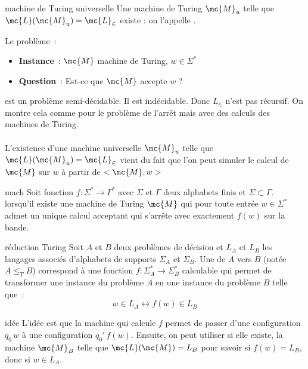 \begin{definition}{}{machine de Turing universelle}
    Une machine de Turing $\mc{M}_u$ telle que $\mc{L}(\mc{M}_u) = \mc{L}_\in$ existe : on l'appelle .
\end{definition}

\begin{remarque}{}{}
    Le problème~:
    \begin{itemize}
        \item \textbf{Instance}~: $\mc{M}$ machine de Turing, $w \in \Sigma^*$ 
        \item \textbf{Question}~: Est-ce que $\mc{M}$ accepte $w$ ?
    \end{itemize}
    est un problème semi-décidable. Il est indécidable. Donc $L_\in$ n'est pas récursif. On montre cela comme pour le problème de l'arrêt mais avec des calculs des machines de Turing.\\\\
    L'existence d'une machine universelle $\mc{M}_u$ telle que $\mc{L}(\mc{M}_u) = \mc{L}_\in$ vient du fait que l'on peut simuler le calcul de $\mc{M}$ sur $w$ à partir de $<\mc{M}, w>$
\end{remarque}

\begin{definition}{}{mach}
    Soit fonction $f: \Sigma^* \to \Gamma^*$ avec $\Sigma$ et $\Gamma$ deux alphabets finis et $\Sigma \subset \Gamma$.  lorsqu'il existe une machine de Turing $\mc{M}$ qui pour toute entrée $w \in \Sigma^*$ admet un unique calcul acceptant qui s'arrête avec exactement $f(w)$ sur la bande.
\end{definition}

\begin{definition}{}{réduction Turing}
    Soit $A$ et $B$ deux problèmes de décision et $L_A$ et $L_B$ les langages associés d'alphabets de supports $\Sigma_A$ et $\Sigma_B$. Une  de $A$ vers $B$ (notée $A \leq_T B$) correspond à une fonction $f : \Sigma_A^* \to \Sigma_B^*$ calculable qui permet de transformer une instance du problème $A$ en une instance du problème $B$ telle que~:
    $$w \in L_A \longleftrightarrow f(w) \in L_B$$
\end{definition}


\begin{remarque}{}{idée}
    L'idée est que la machine qui calcule $f$ permet de passer d'une configuration $q_0 \, w$ à une configuration $q_0' \, f(w)$. Ensuite, on peut utiliser si elle existe, la machine $\mc{M}_B$ telle que $\mc{L}(\mc{M}) = L_B$ pour savoir si $f(w) = L_B$, donc si $w \in L_A$.
\end{remarque}

